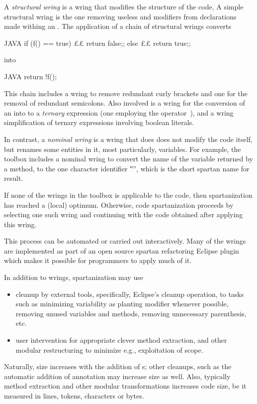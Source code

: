 A \emph{structural wring} is a wring that modifies the structure of the code,
A simple structural wring is the one removing
useless  and  modifiers from
declarations made withing an .
The application of a chain of structural wrings converts
\begin{lcode}{JAVA}
if (f() == true) {££
  return false;;
} else {££
  return true;;
}
\end{lcode}
\noindent into 
\begin{lcode}{JAVA}
return !f();
\end{lcode}
\noindent 
This chain includes a wring to remove redundant curly brackets and one for the
removal of redundant semicolons.
Also involved is a wring for the conversion of an  into to a
\emph{ternary} expression (one employing the operator~), and a
wring simplification of ternary expressions involving boolean literals.

In contrast, a \emph{nominal wring} is a wring that does does not modify the
code itself, but renames some entities in it, most particularly, variables.
For example, the toolbox includes a nominal wring to convert the name of the
variable returned by a method, to the one character identifier ‟\cc{\$}”,
which is the short spartan name for result.

If none of the wrings in the toolbox is applicable to the code, then
spartanization has reached a (local) optimum. Otherwise, code spartanization
proceeds by selecting one such wring and continuing with the code obtained
after applying this wring.

This process can be automated or carried out interactively. Many of the wrings
are implemented as part of an open source spartan refactoring Eclipse
plugin which
makes it possible for programmers to apply much of it.

In addition to wrings, spartanization may use
\begin{itemize}
    \item cleanup by external tools, specifically, Eclipse's cleanup operation,
      to tasks such as minimizing variability as planting  modifier
      whenever possible, removing unused variables and methods, removing
      unnecessary parenthesis, etc.
    \item user intervention for appropriate
        clever method extraction, and other modular restructuring to
        minimize e.g., exploitation of scope.
\end{itemize}
Naturally, size increases with the addition of s; other cleanups, such
as the automatic addition of  annotation may increase size as well.
Also, typically method extraction and other modular transformations increases
code size, be it measured in lines, tokens, characters or bytes.


